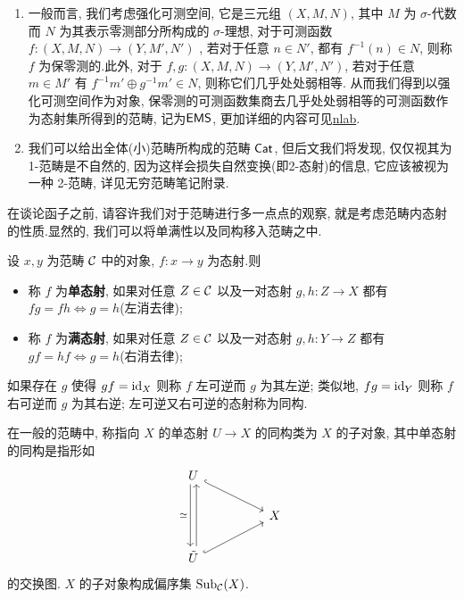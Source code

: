 \begin{example}
\begin{enumerate}
        \item 一般而言, 我们考虑强化可测空间, 它是三元组 $(X,M,N)$, 其中 $M$ 为 $\sigma$-代数而 $N$ 为其表示零测部分所构成的 $\sigma$-理想, 对于可测函数 $f : (X,M,N) \to (Y,M',N')$ , 若对于任意 $n\in N'$, 都有 $f^{-1}(n) \in N$, 则称 $f$ 为保零测的.此外, 对于 $f,g : (X,M,N) \to (Y,M',N')$, 若对于任意 $m\in M'$ 有 $f^{-1}m'\oplus g^{-1}m'\in N$, 则称它们几乎处处弱相等.
        从而我们得到以强化可测空间作为对象, 保零测的可测函数集商去几乎处处弱相等的可测函数作为态射集所得到的范畴, 记为$\mathsf{EMS}$, 更加详细的内容可见\href{https://ncatlab.org/nlab/show/categories+of+measure+theory}{nlab}.
        \item 我们可以给出全体(小)范畴所构成的范畴 $\mathsf{Cat}$, 但后文我们将发现, 仅仅视其为 1-范畴是不自然的, 因为这样会损失自然变换(即2-态射)的信息, 它应该被视为一种 2-范畴, 详见无穷范畴笔记附录.
    \end{enumerate}
\end{example}
在谈论函子之前, 请容许我们对于范畴进行多一点点的观察, 就是考虑范畴内态射的性质.显然的, 我们可以将单满性以及同构移入范畴之中.
\begin{definition}
    设 $x,y$ 为范畴 $\cal{C}$ 中的对象, $f:x \to y$ 为态射.则
    \begin{itemize}
        \item 称 $f$ 为\textbf{单态射}, 如果对任意 $Z\in \cal{C}$ 以及一对态射 $g,h : Z \to X$ 都有 $fg = fh \Leftrightarrow g=h$(左消去律);
        \item 称 $f$ 为\textbf{满态射}, 如果对任意 $Z \in \cal{C}$ 以及一对态射 $g,h : Y \to Z$ 都有 $gf = hf \Leftrightarrow g=h$(右消去律);
    \end{itemize}
    如果存在 $g$ 使得 $gf = \mathrm{id}_X$ 则称 $f$ 左可逆而 $g$ 为其左逆; 类似地, $fg = \mathrm{id}_Y$ 则称 $f$ 右可逆而 $g$ 为其右逆; 左可逆又右可逆的态射称为同构.
\end{definition}
\begin{definition}[子对象]\label{定义-子对象}
    在一般的范畴中, 称指向 $X$ 的单态射 $U\to X$ 的同构类为 $X$ 的子对象, 其中单态射的同构是指形如
    \[\begin{tikzcd}
	U \\
	&& X \\
	{\tilde{U}}
	\arrow[hook, from=1-1, to=2-3]
	\arrow["\simeq"', shift right, from=1-1, to=3-1]
	\arrow[shift right, from=3-1, to=1-1]
	\arrow[hook, from=3-1, to=2-3]
    \end{tikzcd}\]
    的交换图. $X$ 的子对象构成偏序集 $\operatorname{Sub}_{\cal{C}}(X)$.
\end{definition}

